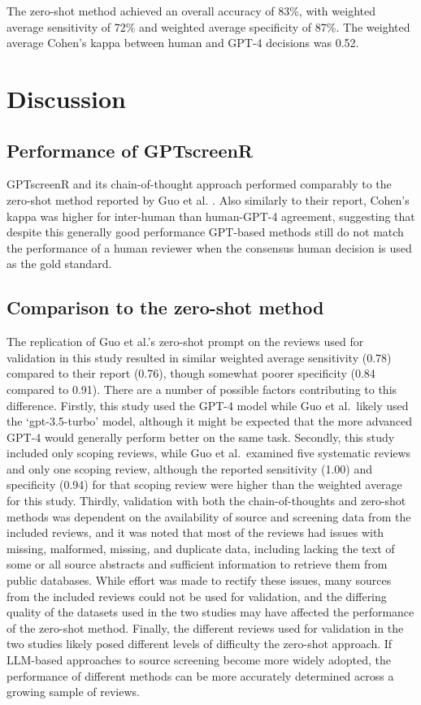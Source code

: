\documentclass[10pt,a4paper,twocolumn]{article}
\begin{document}
The zero-shot method achieved an overall accuracy of 83\%, with weighted average sensitivity of 72\% and weighted average specificity of 87\%. The weighted average Cohen's kappa between human and GPT-4 decisions was 0.52.

\section{Discussion}

\subsection{Performance of GPTscreenR}

GPTscreenR and its chain-of-thought approach performed comparably to the zero-shot method reported by Guo et al. \cite{Guo.2023}. Also similarly to their report, Cohen's kappa was higher for inter-human than human-GPT-4 agreement, suggesting that despite this generally good performance GPT-based methods still do not match the performance of a human reviewer when the consensus human decision is used as the gold standard.

\subsection{Comparison to the zero-shot method}

The replication of Guo et al.'s zero-shot prompt on the reviews used for validation in this study resulted in similar weighted average sensitivity (0.78) compared to their report (0.76), though somewhat poorer specificity (0.84 compared to 0.91). There are a number of possible factors contributing to this difference. Firstly, this study used the GPT-4 model while Guo et al.~likely used the `gpt-3.5-turbo' model, although it might be expected that the more advanced GPT-4 would generally perform better on the same task. Secondly, this study included only scoping reviews, while Guo et al.~examined five systematic reviews and only one scoping review, although the reported sensitivity (1.00) and specificity (0.94) for that scoping review were higher than the weighted average for this study. Thirdly, validation with both the chain-of-thoughts and zero-shot methods was dependent on the availability of source and screening data from the included reviews, and it was noted that most of the reviews had issues with missing, malformed, missing, and duplicate data, including lacking the text of some or all source abstracts and sufficient information to retrieve them from public databases. While effort was made to rectify these issues, many sources from the included reviews could not be used for validation, and the differing quality of the datasets used in the two studies may have affected the performance of the zero-shot method. Finally, the different reviews used for validation in the two studies likely posed different levels of difficulty the zero-shot approach. If LLM-based approaches to source screening become more widely adopted, the performance of different methods can be more accurately determined across a growing sample of reviews.
\end{document}
